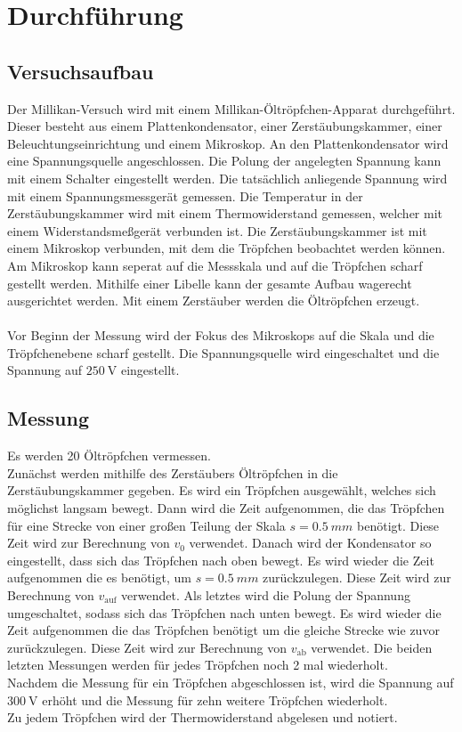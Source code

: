 \section{Durchführung}
\label{sec:Durchführung}

\subsection{Versuchsaufbau}
\label{sec:Versuchsaufbau}


Der Millikan-Versuch wird mit einem Millikan-Öltröpfchen-Apparat durchgeführt.
Dieser besteht aus einem Plattenkondensator, einer Zerstäubungskammer, einer Beleuchtungseinrichtung und einem Mikroskop.
An den Plattenkondensator wird eine Spannungsquelle angeschlossen.
Die Polung der angelegten Spannung kann mit einem Schalter eingestellt werden.
Die tatsächlich anliegende Spannung wird mit einem Spannungsmessgerät gemessen.
Die Temperatur in der Zerstäubungskammer wird mit einem Thermowiderstand gemessen,
welcher mit einem Widerstandsmeßgerät verbunden ist.
Die Zerstäubungskammer ist mit einem Mikroskop verbunden, mit dem die Tröpfchen beobachtet werden können.
Am Mikroskop kann seperat auf die Messskala und auf die Tröpfchen scharf gestellt werden.
Mithilfe einer Libelle kann der gesamte Aufbau wagerecht ausgerichtet werden.
Mit einem Zerstäuber werden die Öltröpfchen erzeugt.\\
\\
Vor Beginn der Messung wird der Fokus des Mikroskops auf die Skala und die Tröpfchenebene scharf gestellt.
Die Spannungsquelle wird eingeschaltet und die Spannung auf $\SI{250}{\volt}$ eingestellt.



\subsection{Messung}
\label{sec:Messung}


Es werden 20 Öltröpfchen vermessen.\\
Zunächst werden mithilfe des Zerstäubers Öltröpfchen in die Zerstäubungskammer gegeben.
Es wird ein Tröpfchen ausgewählt, welches sich möglichst langsam bewegt.
Dann wird die Zeit aufgenommen, die das Tröpfchen für eine Strecke von einer großen Teilung der Skala $s = \SI{0.5}{mm}$ benötigt.
Diese Zeit wird zur Berechnung von $v_0$ verwendet. 
Danach wird der Kondensator so eingestellt, dass sich das Tröpfchen nach oben bewegt.
Es wird wieder die Zeit aufgenommen die es benötigt, um $s = \SI{0.5}{mm}$ zurückzulegen.
Diese Zeit wird zur Berechnung von $v_\text{auf}$ verwendet.
Als letztes wird die Polung der Spannung umgeschaltet, sodass sich das Tröpfchen nach unten bewegt.
Es wird wieder die Zeit aufgenommen die das Tröpfchen benötigt um die gleiche Strecke wie zuvor zurückzulegen.
Diese Zeit wird zur Berechnung von $v_\text{ab}$ verwendet.
Die beiden letzten Messungen werden für jedes Tröpfchen noch 2 mal wiederholt.
\\
Nachdem die Messung für ein Tröpfchen abgeschlossen ist, wird die Spannung auf $\SI{300}{\volt}$ erhöht und die Messung für zehn weitere Tröpfchen wiederholt.
\\
Zu jedem Tröpfchen wird der Thermowiderstand abgelesen und notiert.\\